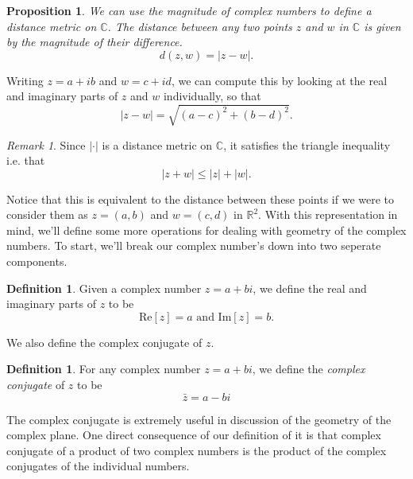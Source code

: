 \documentclass[12pt]{article}
\newcommand{\bbR}{\mathbb{R}}
\newcommand{\bbC}{\mathbb{C}}
\newcommand{\abs}[1]{ \left| #1 \right| }
\renewcommand{\Re}{\text{Re}}
\renewcommand{\Im}{\text{Im}}
\newtheorem{prop}[thm]{Proposition}
\theoremstyle{definition}
\newtheorem{defn}[thm]{Definition}
\theoremstyle{remark}
\newtheorem{rem}[thm]{Remark}
\numberwithin{equation}{section}
\begin{document}
\begin{prop}
  We can use the magnitude of complex numbers to define a distance metric on $\bbC$. The distance between any two points $z$ and $w$ in $\bbC$ is given by the magnitude of their difference.
  \begin{equation}
    d(z,w) = \abs{z - w}. 
  \end{equation}

\end{prop}
Writing $z = a + ib$ and $w = c + id$, we can compute this by looking at the real and imaginary parts of $z$ and $w$ individually, so that
\begin{equation}
  \abs{z - w} = \sqrt{(a-c)^2 + (b-d)^2}.
\end{equation}

\begin{rem}
  Since $\abs{\cdot}$ is a distance metric on $\bbC$, it satisfies the triangle inequality i.e. that
  \begin{equation}
    \abs{z+w}\leq \abs{z} + \abs{w}.
  \end{equation}
\end{rem}

Notice that this is equivalent to the distance between these points if we were to consider them as $z=(a,b)$ and $w=(c,d)$ in $\bbR^2$. With this representation in mind, we'll define some more operations for dealing with geometry of the complex numbers. To start, we'll break our complex number's down into two seperate components.

\begin{defn}
Given a complex number $z = a + bi$, we define the real and imaginary parts of $z$ to be
\begin{equation}
  \Re[z] = a \text{ and  } \Im[z] = b.
\end{equation}
\end{defn}

We also define the complex conjugate of $z$.
\begin{defn}
For any complex number $z = a + bi$, we define the \emph{complex conjugate} of $z$ to be 
\begin{equation}
  \bar{z} = a - bi
\end{equation}
\end{defn}

The complex conjugate is extremely useful in discussion of the geometry of the complex plane. One direct consequence of our definition of it is that complex conjugate of a product of two complex numbers is the product of the complex conjugates of the individual numbers.
\end{document}
